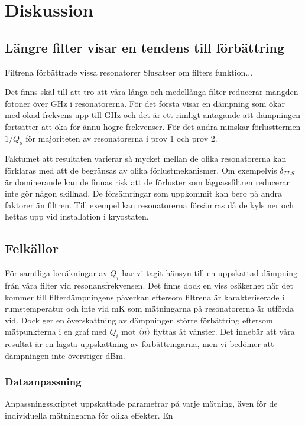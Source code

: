 \documentclass[main.tex]{subfiles}
\begin{document}
\chapter{Diskussion}
\label{ch:discussion} 

\section{Längre filter visar en tendens till förbättring}
Filtrena förbättrade vissa resonatorer
Slusatser om filters funktion...






Det finns skäl till att tro att våra långa och medellånga filter reducerar mängden fotoner över \unit[88]{GHz} i resonatorerna. För det första visar  en dämpning som ökar med ökad frekvens upp till \unit[50]{GHz} och det är ett rimligt antagande att dämpningen fortsätter att öka för ännu högre frekvenser. För det andra minskar förlusttermen $1/Q_o$ för majoriteten av resonatorerna i prov 1 och prov 2.

Faktumet att resultaten varierar så mycket mellan de olika resonatorerna kan förklaras med att de begränsas av olika förlustmekanismer. Om exempelvis $\delta_{TLS}$ är dominerande kan de finnas risk att de förluster som lågpassfiltren reducerar inte gör någon skillnad.
De försämringar som uppkommit kan bero på andra faktorer än filtren. Till exempel kan resonatorerna försämras då de kyls ner och hettas upp vid installation i kryostaten.

\section{Felkällor}
För samtliga beräkningar av $Q_i$ har vi tagit hänsyn till en uppskattad dämpning från våra filter vid resonansfrekvensen. Det finns dock en viss osäkerhet när det kommer till filterdämpningens påverkan eftersom filtrena är karakteriserade i rumstemperatur och inte vid \unit[10]{mK} som mätningarna på resonatorerna är utförda vid. Dock ger en överskattning av dämpningen större förbättring eftersom mätpunkterna i en graf med $Q_i$ mot $\expval{n}$ flyttas åt vänster. Det innebär att våra resultat är en lägsta uppskattning av förbättringarna, men vi bedömer att dämpningen inte överstiger \unit[-2]{dBm}.

\subsection{Dataanpassning}
Anpassningsskriptet uppskattade parametrar på varje mätning, även för de individuella mätningarna för olika effekter. En 
\end{document}
